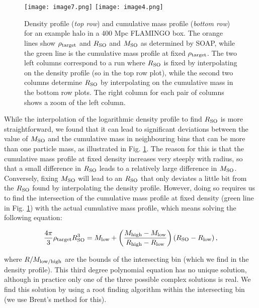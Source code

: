 \documentclass{article}
\begin{document}
\begin{figure}
    \centering
    \texttt{[image: image7.png]}
    \texttt{[image: image4.png]}
    \caption{Density profile (\emph{top row}) and cumulative mass profile (\emph{bottom row}) for an example 
    halo in a 400 Mpc FLAMINGO box. The orange lines show $\rho{}_{\rm{}target}$ and $R_{\rm{}SO}$ and 
    $M_{\rm{}SO}$ as determined by SOAP, while the green line is the cumulative mass profile at fixed 
    $\rho{}_{\rm{}target}$. The two left columns correspond to a run where $R_{\rm{}SO}$ is fixed by 
    interpolating on the density profile (so in the top row plot), while the second two columns determine 
    $R_{\rm{}SO}$ by interpolating on the cumulative mass in the bottom row plots. The right column for each 
    pair of columns shows a zoom of the left column.}
    \label{fig:MSO_vs_RSO}
\end{figure}

While the interpolation of the logarithmic density profile to find $R_{\rm{}SO}$ is more straightforward, we 
found that it can lead to significant deviations between the value of $M_{\rm{}SO}$ and the cumulative mass in 
neighbouring bins that can be more than one particle mass, as illustrated in Fig. \ref{fig:MSO_vs_RSO}. The 
reason for this is that the cumulative mass profile at fixed density increases very steeply with radius, so 
that a small difference in $R_{\rm{}SO}$ leads to a relatively large difference in $M_{\rm{}SO}$. Conversely, 
fixing $M_{\rm{}SO}$ will lead to an $R_{\rm{}SO}$ that only deviates a little bit from the $R_{\rm{}SO}$ 
found by interpolating the density profile. However, doing so requires us to find the intersection of the 
cumulative mass profile at fixed density (green line in Fig. \ref{fig:MSO_vs_RSO}) with the actual cumulative 
mass profile, which means solving the following equation:

\begin{equation}
    \frac{4\pi{}}{3} \rho{}_{\rm{}target} R_{\rm{}SO}^3 = M_{\rm{}low} + \left( \frac{M_{\rm{}high}-M_{\rm{}low}}{R_{\rm{}high} - R_{\rm{}low}} \right) \left(R_{\rm{}SO} - R_{\rm{}low}\right),
    \label{eq:RSO}
\end{equation}

where $R/M_{\rm{}low/high}$ are the bounds of the intersecting bin (which we find in the density profile). 
This third degree polynomial equation has no unique solution, although in practice only one of the three 
possible complex solutions is real. We find this solution by using a root finding algorithm within the 
intersecting bin (we use Brent's method for this).
\end{document}
